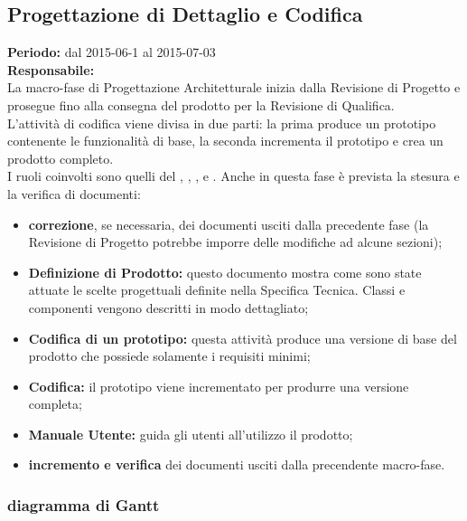 \newpage
\subsection{Progettazione di Dettaglio e Codifica}
\textbf{Periodo:} dal 2015-06-1 al 2015-07-03 \\
\textbf{Responsabile:} \CoMa \\
La macro-fase di Progettazione Architetturale inizia dalla Revisione di Progetto e prosegue fino alla consegna del prodotto per la Revisione di Qualifica. \\
L'attività di codifica viene divisa in due parti: la prima produce un prototipo contenente le funzionalità di base, la seconda incrementa il prototipo e crea un prodotto completo. \\
I ruoli coinvolti sono quelli del \ruoloResponsabile{}, \ruoloAmministratore{}, \ruoloProgettista{}, \ruoloVerificatore{} e \ruoloProgrammatore{}.
Anche in questa fase è prevista la stesura e la verifica di documenti:
\begin{itemize}
\item \textbf{correzione}, se necessaria, dei documenti usciti dalla precedente fase (la Revisione di Progetto potrebbe imporre delle modifiche ad alcune sezioni);
\item \textbf{Definizione di Prodotto:} questo documento mostra come sono state attuate le scelte progettuali definite nella Specifica Tecnica. Classi e componenti vengono descritti in modo dettagliato;
\item \textbf{Codifica di un prototipo:} questa attività produce una versione di base del prodotto che possiede solamente i requisiti minimi;
\item \textbf{Codifica:} il prototipo viene incrementato per produrre una versione completa;
\item \textbf{Manuale Utente:} guida gli utenti all'utilizzo il prodotto;
\item \textbf{incremento e verifica} dei documenti usciti dalla precendente macro-fase.
\end{itemize}

\newpage
\subsubsection{diagramma di Gantt}

